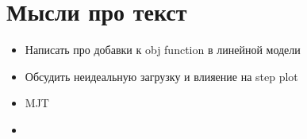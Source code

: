 \section*{Мысли про текст}


\begin{itemize}
	\item Написать про добавки к obj function в линейной модели
	\item Обсудить неидеальную загрузку и влияение на step plot
	\item MJT
	\item 
\end{itemize}


